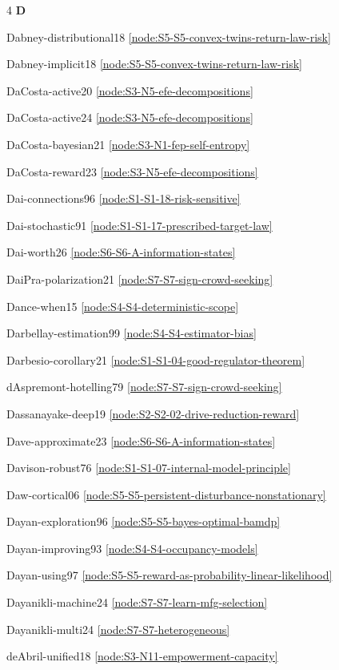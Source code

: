 \documentclass[10pt]{article}
\begin{document}
{\begin{multicols}{4}
\smallskip\textbf{D}\par
Dabney-distributional18 \hfill \ref{node:S5-S5-convex-twins-return-law-risk}\par
Dabney-implicit18 \hfill \ref{node:S5-S5-convex-twins-return-law-risk}\par
DaCosta-active20 \hfill \ref{node:S3-N5-efe-decompositions}\par
DaCosta-active24 \hfill \ref{node:S3-N5-efe-decompositions}\par
DaCosta-bayesian21 \hfill \ref{node:S3-N1-fep-self-entropy}\par
DaCosta-reward23 \hfill \ref{node:S3-N5-efe-decompositions}\par
Dai-connections96 \hfill \ref{node:S1-S1-18-risk-sensitive}\par
Dai-stochastic91 \hfill \ref{node:S1-S1-17-prescribed-target-law}\par
Dai-worth26 \hfill \ref{node:S6-S6-A-information-states}\par
DaiPra-polarization21 \hfill \ref{node:S7-S7-sign-crowd-seeking}\par
Dance-when15 \hfill \ref{node:S4-S4-deterministic-scope}\par
Darbellay-estimation99 \hfill \ref{node:S4-S4-estimator-bias}\par
Darbesio-corollary21 \hfill \ref{node:S1-S1-04-good-regulator-theorem}\par
dAspremont-hotelling79 \hfill \ref{node:S7-S7-sign-crowd-seeking}\par
Dassanayake-deep19 \hfill \ref{node:S2-S2-02-drive-reduction-reward}\par
Dave-approximate23 \hfill \ref{node:S6-S6-A-information-states}\par
Davison-robust76 \hfill \ref{node:S1-S1-07-internal-model-principle}\par
Daw-cortical06 \hfill \ref{node:S5-S5-persistent-disturbance-nonstationary}\par
Dayan-exploration96 \hfill \ref{node:S5-S5-bayes-optimal-bamdp}\par
Dayan-improving93 \hfill \ref{node:S4-S4-occupancy-models}\par
Dayan-using97 \hfill \ref{node:S5-S5-reward-as-probability-linear-likelihood}\par
Dayanikli-machine24 \hfill \ref{node:S7-S7-learn-mfg-selection}\par
Dayanikli-multi24 \hfill \ref{node:S7-S7-heterogeneous}\par
deAbril-unified18 \hfill \ref{node:S3-N11-empowerment-capacity}\par

\end{multicols}}
\end{document}
